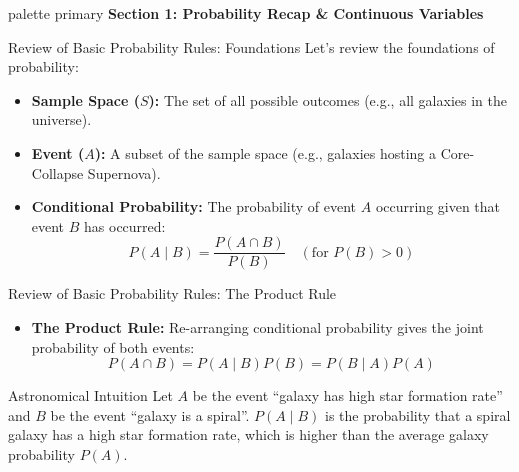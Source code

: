 \documentclass[9pt]{beamer}
\begin{document}
\begin{frame}[plain]
  \vfill
  \centering
  \begin{beamercolorbox}[sep=8pt,center,shadow=true,rounded=true]{palette primary}
    \textbf{Section 1: Probability Recap \& Continuous Variables}
  \end{beamercolorbox}
  \vfill
\end{frame}

\begin{frame}{Review of Basic Probability Rules: Foundations}
  Let's review the foundations of probability:
  \begin{itemize}
    \item \textbf{Sample Space ($S$):} The set of all possible outcomes (e.g., all galaxies in the universe).
    \item \textbf{Event ($A$):} A subset of the sample space (e.g., galaxies hosting a Core-Collapse Supernova).
    \item \textbf{Conditional Probability:} The probability of event $A$ occurring given that event $B$ has occurred:
      $$P(A \mid B) = \frac{P(A \cap B)}{P(B)} \quad (\text{for } P(B) > 0)$$
  \end{itemize}
\end{frame}

\begin{frame}{Review of Basic Probability Rules: The Product Rule}
  \begin{itemize}
    \item \textbf{The Product Rule:} Re-arranging conditional probability gives the joint probability of both events:
      $$P(A \cap B) = P(A \mid B)P(B) = P(B \mid A)P(A)$$
  \end{itemize}
  \begin{exampleblock}{Astronomical Intuition}
    Let $A$ be the event ``galaxy has high star formation rate'' and $B$ be the event ``galaxy is a spiral''. $P(A \mid B)$ is the probability that a spiral galaxy has a high star formation rate, which is higher than the average galaxy probability $P(A)$.
  \end{exampleblock}
\end{frame}
\end{document}
